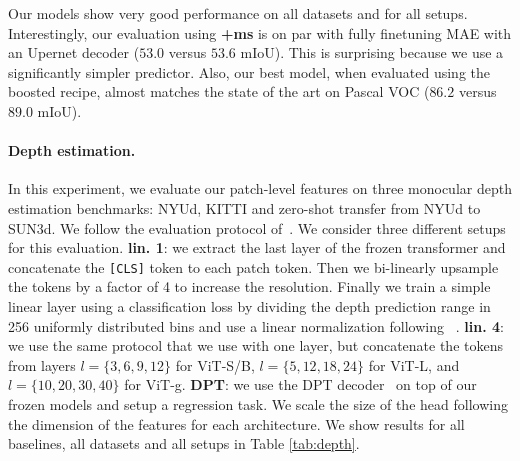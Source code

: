 Our models show very good performance on all datasets and for all setups. Interestingly, our evaluation using \textbf{+ms} is on par with fully finetuning MAE with an Upernet decoder ($53.0$ versus $53.6$ mIoU). This is surprising because we use a significantly simpler predictor. Also, our best model, when evaluated using the boosted recipe, almost matches the state of the art on Pascal VOC ($86.2$ versus $89.0$ mIoU).


\paragraph{Depth estimation.} In this experiment, we evaluate our patch-level features on three monocular depth estimation benchmarks: NYUd, KITTI and zero-shot transfer from NYUd to SUN3d. We follow the evaluation protocol of~\citet{li2022binsformer}.
We consider three different setups for this evaluation.
\textbf{lin. 1}: we extract the last layer of the frozen transformer and concatenate the \texttt{[CLS]} token to each patch token. Then we bi-linearly upsample the tokens by a factor of 4 to increase the resolution. Finally we train a simple linear layer using a classification loss by dividing the depth prediction range in 256 uniformly distributed bins and use a linear normalization following ~\cite{bhat2019adabins}.
\textbf{lin. 4}: we use the same protocol that we use with one layer, but concatenate the tokens from layers $l=\{3,6,9,12\}$ for ViT-S/B, $l=\{5,12,18,24\}$ for ViT-L, and $l=\{10, 20, 30, 40\}$ for ViT-g.
\textbf{DPT}: we use the DPT decoder~\citep{ranftl2021vision} on top of our frozen models and setup a regression task. We scale the size of the head following the dimension of the features for each architecture. We show results for all baselines, all datasets and all setups in Table \ref{tab:depth}.


